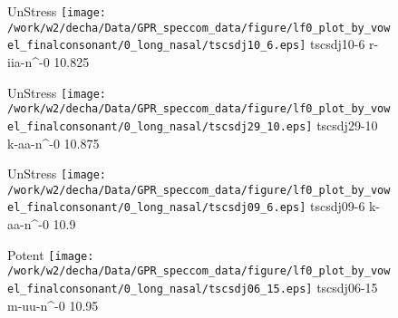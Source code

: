 \documentclass{article}
\begin{document}
\begin{figure}[t]
\begin{minipage}[b]{.24\textwidth}
UnStress
\centering
\texttt{[image: /work/w2/decha/Data/GPR\_speccom\_data/figure/lf0\_plot\_by\_vowel\_finalconsonant/0\_long\_nasal/tscsdj10\_6.eps]}
tscsdj10-6 r-iia-n\textasciicircum-0 10.825
\end{minipage}
\begin{minipage}[b]{.24\textwidth}
UnStress
\centering
\texttt{[image: /work/w2/decha/Data/GPR\_speccom\_data/figure/lf0\_plot\_by\_vowel\_finalconsonant/0\_long\_nasal/tscsdj29\_10.eps]}
tscsdj29-10 k-aa-n\textasciicircum-0 10.875
\end{minipage}
\begin{minipage}[b]{.24\textwidth}
UnStress
\centering
\texttt{[image: /work/w2/decha/Data/GPR\_speccom\_data/figure/lf0\_plot\_by\_vowel\_finalconsonant/0\_long\_nasal/tscsdj09\_6.eps]}
tscsdj09-6 k-aa-n\textasciicircum-0 10.9
\end{minipage}
\begin{minipage}[b]{.24\textwidth}
\colorbox{Apricot}{Potent}
\centering
\texttt{[image: /work/w2/decha/Data/GPR\_speccom\_data/figure/lf0\_plot\_by\_vowel\_finalconsonant/0\_long\_nasal/tscsdj06\_15.eps]}
tscsdj06-15 m-uu-n\textasciicircum-0 10.95
\end{minipage}
\end{figure}
\end{document}
